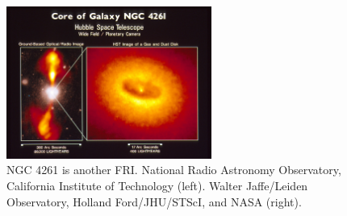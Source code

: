 \documentclass[10pt,a4paper,english]{article}
\begin{document}
\begin{figure}[!ht]
    \centering
    \includegraphics[width=0.6\textwidth]{hs-1992-27-b-full.jpg}
    \caption{
        NGC 4261 is another FRI.
        National Radio Astronomy Observatory, California Institute of
        Technology (left). Walter Jaffe/Leiden Observatory, Holland
        Ford/JHU/STScI, and NASA (right).%
    }
\end{figure}
\end{document}
